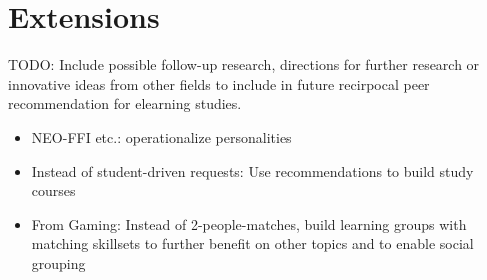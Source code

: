 \documentclass[nochapterpage,bigchapter,linedtoc,longdoc,colorback,accentcolor=tud3b]{tudreport}
\begin{document}
\chapter{Extensions}
TODO: Include possible follow-up research, directions for further research or innovative ideas from other fields to include in future recirpocal peer recommendation for elearning studies.\\
\begin{itemize}
	\item NEO-FFI etc.: operationalize personalities
	\item Instead of student-driven requests: Use recommendations to build study courses
	\item From Gaming: Instead of 2-people-matches, build learning groups with matching skillsets to further benefit on other topics and to enable social grouping\\
\end{itemize}




\end{document}

